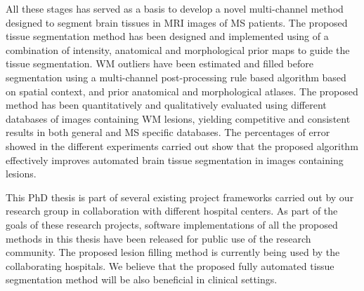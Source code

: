 All these stages has served as a basis to develop a novel multi-channel method designed to segment brain tissues in MRI images of MS patients. The proposed tissue segmentation method has been designed and implemented using of a combination of intensity, anatomical and morphological prior maps to guide the tissue segmentation. WM outliers have been estimated and filled before segmentation using a multi-channel post-processing rule based algorithm based on spatial context, and prior anatomical and morphological atlases. The proposed method has been quantitatively and qualitatively evaluated using different databases of images containing WM lesions, yielding competitive and consistent results in both general and MS specific databases. The percentages of error showed in the different experiments carried out show that the proposed algorithm effectively improves automated brain tissue segmentation in images containing lesions. 

This PhD thesis is part of several existing project frameworks carried out by our research group in collaboration with different hospital centers. As part of the goals of these research projects, software implementations of all the proposed methods in this thesis have been released for public use of the research community. The proposed lesion filling method is currently being used by the collaborating hospitals. We believe that the proposed fully automated tissue segmentation method will be also beneficial in clinical settings.  










